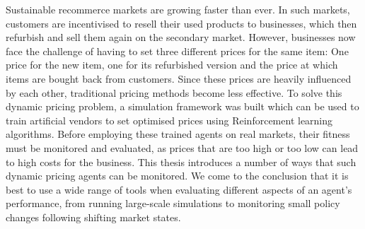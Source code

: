 Sustainable recommerce markets are growing faster than ever. In such markets, customers are incentivised to resell their used products to businesses, which then refurbish and sell them again on the secondary market. However, businesses now face the challenge of having to set three different prices for the same item: One price for the new item, one for its refurbished version and the price at which items are bought back from customers. Since these prices are heavily influenced by each other, traditional pricing methods become less effective. To solve this dynamic pricing problem, a simulation framework was built which can be used to train artificial vendors to set optimised prices using Reinforcement learning algorithms.
Before employing these trained agents on real markets, their fitness must be monitored and evaluated, as prices that are too high or too low can lead to high costs for the business. This thesis introduces a number of ways that such dynamic pricing agents can be monitored. We come to the conclusion that it is best to use a wide range of tools when evaluating different aspects of an agent's performance, from running large-scale simulations to monitoring small policy changes following shifting market states.